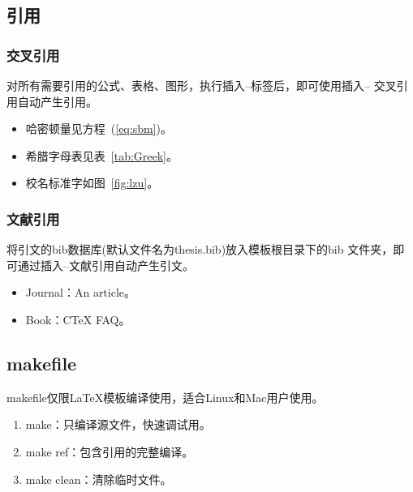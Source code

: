 \documentclass[twoside,longtitle]{LZUthesis}
\begin{document}
\subsection{引用}


\subsubsection{交叉引用}

对所有需要引用的公式、表格、图形，执行插入--标签后，即可使用插入-- 交叉引用自动产生引用。
\begin{itemize}
\item 哈密顿量见方程~(\ref{eq:sbm})。
\item 希腊字母表见表~\ref{tab:Greek}。
\item 校名标准字如图~\ref{fig:lzu}。
\end{itemize}

\subsubsection{文献引用}

将引文的bib数据库(默认文件名为thesis.bib)放入模板根目录下的bib 文件夹，即可通过插入--文献引用自动产生引文。
\begin{itemize}
\item Journal：An article\cite{Liu13PRA-A}。
\item Book：C\TeX{} FAQ\cite{Wu05-C}。
\end{itemize}

\subsection{makefile}

makefile仅限\LaTeX{}模板编译使用，适合Linux和Mac用户使用。
\begin{enumerate}
\item make：只编译源文件，快速调试用。
\item make ref：包含引用的完整编译。
\item make clean：清除临时文件。
\end{enumerate}
\end{document}
